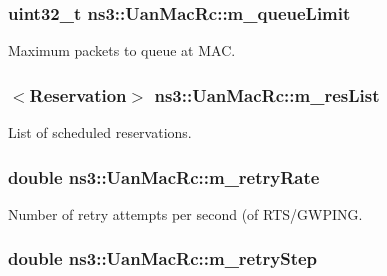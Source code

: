 \subsubsection[{\texorpdfstring{m\+\_\+queue\+Limit}{m_queueLimit}}]{\setlength{\rightskip}{0pt plus 5cm}uint32\+\_\+t ns3\+::\+Uan\+Mac\+Rc\+::m\+\_\+queue\+Limit\hspace{0.3cm}{\ttfamily [private]}}\hypertarget{classns3_1_1UanMacRc_a23f9454b170213f244b931801f186efc}{}\label{classns3_1_1UanMacRc_a23f9454b170213f244b931801f186efc}


Maximum packets to queue at M\+AC. 

\subsubsection[{\texorpdfstring{m\+\_\+res\+List}{m_resList}}]{$<${\bf Reservation}$>$ ns3\+::\+Uan\+Mac\+Rc\+::m\+\_\+res\+List\hspace{0.3cm}{\ttfamily [private]}}\hypertarget{classns3_1_1UanMacRc_ab1c6828d66f3809cd023b279c6c661a1}{}\label{classns3_1_1UanMacRc_ab1c6828d66f3809cd023b279c6c661a1}
List of scheduled reservations. 
\subsubsection[{\texorpdfstring{m\+\_\+retry\+Rate}{m_retryRate}}]{\setlength{\rightskip}{0pt plus 5cm}double ns3\+::\+Uan\+Mac\+Rc\+::m\+\_\+retry\+Rate\hspace{0.3cm}{\ttfamily [private]}}\hypertarget{classns3_1_1UanMacRc_a05998afbcd688ef3c86d762e38ed3927}{}\label{classns3_1_1UanMacRc_a05998afbcd688ef3c86d762e38ed3927}


Number of retry attempts per second (of R\+T\+S/\+G\+W\+P\+I\+NG. 

\subsubsection[{\texorpdfstring{m\+\_\+retry\+Step}{m_retryStep}}]{\setlength{\rightskip}{0pt plus 5cm}double ns3\+::\+Uan\+Mac\+Rc\+::m\+\_\+retry\+Step\hspace{0.3cm}{\ttfamily [private]}}\hypertarget{classns3_1_1UanMacRc_a5fceb8ff276883dca8e0060035af3a60}{}\label{classns3_1_1UanMacRc_a5fceb8ff276883dca8e0060035af3a60}


